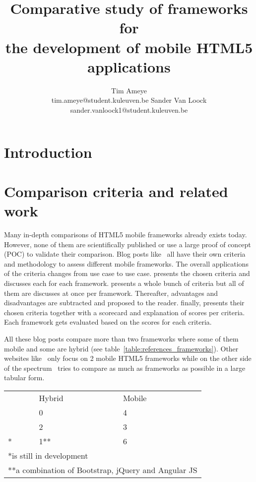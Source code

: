\documentclass[a4paper]{artikel3}
\title{Comparative study of frameworks for \\ the development of mobile HTML5 applications}
\author{Tim Ameye \\ tim.ameye@student.kuleuven.be \And Sander Van Loock \\ sander.vanloock1@student.kuleuven.be}
\begin{document}
\maketitle

\begin{abstract}

\end{abstract}

\section{Introduction} %
\label{sec:introduction}

\section{Comparison criteria and related work}
\label{sec:comparisoncriteria}


Many in-depth comparisons of HTML5 mobile frameworks already exists today.  However, none of them are scientifically published or use a large proof of concept (POC) to validate their comparison.  Blog posts like~\cite{Sarrafi2012a,Ayuso2012,Rozynski2011} all have their own criteria and methodology to assess different mobile frameworks.  The overall applications of the criteria changes from use case to use case.  \cite{Rozynski2011} presents the chosen criteria and discusses each for each framework.  \cite{Ayuso2012} presents a whole bunch of criteria but all of them are discusses at once per framework.  Thereafter,  advantages and disadvantages are subtracted and proposed to the reader.  \cite{Sarrafi2012a} finally,  presents their chosen criteria together with a scorecard and explanation of scores per criteria.  Each framework gets evaluated based on the scores for each criteria.

All these blog posts compare more than two frameworks where some of them mobile and some are hybrid (see table~\ref{table:references_frameworks}).  Other websites like~\cite{Bristowe2012,Burris} only focus on 2 mobile HTML5 frameworks while on the other side of the spectrum~\cite{Falk2011} tries to compare as much as frameworks as possible in a large tabular form.


\begin{center}
\begin{tabular}{lll}
  & Hybrid & Mobile\\
\cite{Sarrafi2012a} & 0 & 4\\
\cite{Rozynski2011} & 2 & 3\\
\cite{Ayuso2012}* & 1** & 6 \\
\multicolumn{3}{l}{*is still in development} \\
\multicolumn{3}{l}{**a combination of Bootstrap, jQuery and Angular JS}
\label{table:references_frameworks}
\end{tabular}
\end{center}
\end{document}
